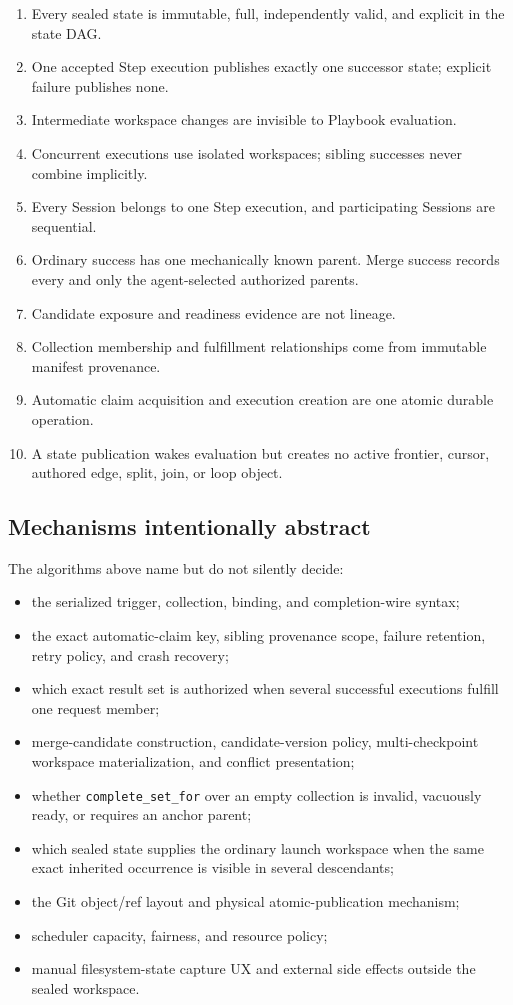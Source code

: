 \documentclass[11pt]{article}
\begin{document}
\begin{enumerate}
  \item Every sealed state is immutable, full, independently valid, and explicit in the state DAG.
  \item One accepted Step execution publishes exactly one successor state; explicit failure publishes none.
  \item Intermediate workspace changes are invisible to Playbook evaluation.
  \item Concurrent executions use isolated workspaces; sibling successes never combine implicitly.
  \item Every Session belongs to one Step execution, and participating Sessions are sequential.
  \item Ordinary success has one mechanically known parent. Merge success records every and only the agent-selected authorized parents.
  \item Candidate exposure and readiness evidence are not lineage.
  \item Collection membership and fulfillment relationships come from immutable manifest provenance.
  \item Automatic claim acquisition and execution creation are one atomic durable operation.
  \item A state publication wakes evaluation but creates no active frontier, cursor, authored edge, split, join, or loop object.
\end{enumerate}

\subsection{Mechanisms intentionally abstract}

The algorithms above name but do not silently decide:

\begin{itemize}
  \item the serialized trigger, collection, binding, and completion-wire syntax;
  \item the exact automatic-claim key, sibling provenance scope, failure retention, retry policy, and crash recovery;
  \item which exact result set is authorized when several successful executions fulfill one request member;
  \item merge-candidate construction, candidate-version policy, multi-checkpoint workspace materialization, and conflict presentation;
  \item whether \texttt{complete\_set\_for} over an empty collection is invalid, vacuously ready, or requires an anchor parent;
  \item which sealed state supplies the ordinary launch workspace when the same exact inherited occurrence is visible in several descendants;
  \item the Git object/ref layout and physical atomic-publication mechanism;
  \item scheduler capacity, fairness, and resource policy;
  \item manual filesystem-state capture UX and external side effects outside the sealed workspace.
\end{itemize}
\end{document}
